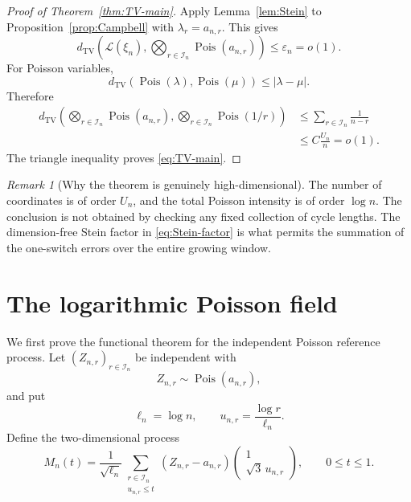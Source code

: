 \documentclass[11pt]{article}
\theoremstyle{definition}
\theoremstyle{remark}
\newtheorem{remark}[theorem]{Remark}
\newcommand{\Pois}{\operatorname{Pois}}
\newcommand{\TV}{\mathrm{TV}}
\newcommand{\cL}{\mathcal L}
\newcommand{\cI}{\mathcal I}
\begin{document}
\begin{proof}[Proof of Theorem~\ref{thm:TV-main}]
Apply Lemma~\ref{lem:Stein} to Proposition~\ref{prop:Campbell} with
$\lambda_r=a_{n,r}$.  This gives
\begin{equation}\label{eq:TV-anr}
 d_{\TV}\left(
 \cL(\xi_n),
 \bigotimes_{r\in\cI_n}\Pois(a_{n,r})
 \right)\le\varepsilon_n=o(1).
\end{equation}
For Poisson variables,
\[
 d_{\TV}(\Pois(\lambda),\Pois(\mu))
 \le |\lambda-\mu|.
\]
Therefore
\begin{align*}
 d_{\TV}\left(
 \bigotimes_{r\in\cI_n}\Pois(a_{n,r}),
 \bigotimes_{r\in\cI_n}\Pois(1/r)
 \right)
 &\le\sum_{r\in\cI_n}\frac1{n-r}\\
 &\le C\frac{U_n}{n}=o(1).
\end{align*}
The triangle inequality proves \eqref{eq:TV-main}.
\end{proof}

\begin{remark}[Why the theorem is genuinely high-dimensional]
The number of coordinates is of order $U_n$, and the total Poisson intensity
is of order $\log n$.  The conclusion is not obtained by checking any fixed
collection of cycle lengths.  The dimension-free Stein factor in
\eqref{eq:Stein-factor} is what permits the summation of the one-switch
errors over the entire growing window.
\end{remark}

\section{The logarithmic Poisson field}

We first prove the functional theorem for the independent Poisson reference
process.  Let $(Z_{n,r})_{r\in\cI_n}$ be independent with
\begin{equation}\label{eq:Poisson-anr}
 Z_{n,r}\sim\Pois(a_{n,r}),
\end{equation}
and put
\[
 \ell_n=\log n,
 \qquad
 u_{n,r}=\frac{\log r}{\ell_n}.
\]
Define the two-dimensional process
\begin{equation}\label{eq:Mn}
 M_n(t)=\frac1{\sqrt{\ell_n}}
 \sum_{\substack{r\in\cI_n\\u_{n,r}\le t}}
 (Z_{n,r}-a_{n,r})
 \begin{pmatrix}1\\ \sqrt3\,u_{n,r}\end{pmatrix},
 \qquad 0\le t\le1.
\end{equation}
\end{document}
